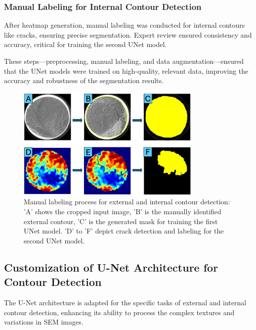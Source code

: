 \documentclass{ieeeaccess}
\begin{document}
\subsubsection{Manual Labeling for Internal Contour Detection}
After heatmap generation, manual labeling was conducted for internal contours like cracks, ensuring precise segmentation. Expert review ensured consistency and accuracy, critical for training the second UNet model.

These steps—preprocessing, manual labeling, and data augmentation—ensured that the UNet models were trained on high-quality, relevant data, improving the accuracy and robustness of the segmentation results.

\begin{figure}[!t]
  \centering
  \includegraphics[width=0.8\textwidth]{figures/lables.png}
  \caption{Manual labeling process for external and internal contour detection: 'A' shows the cropped input image, 'B' is the manually identified external contour, 'C' is the generated mask for training the first UNet model. 'D' to 'F' depict crack detection and labeling for the second UNet model.}
  \label{lables}
\end{figure}


\subsection{Customization of U-Net Architecture for Contour Detection}
\label{subsec:UNetArchitectureCustomization}
The U-Net architecture is adapted for the specific tasks of external and internal contour detection, enhancing its ability to process the complex textures and variations in SEM images.
\end{document}
